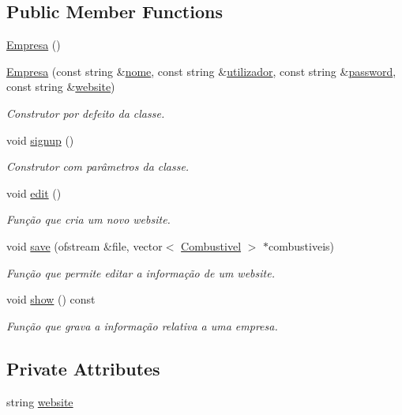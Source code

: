 \subsection*{Public Member Functions}
\begin{DoxyCompactItemize}
\item 
\hyperlink{class_empresa_aff124b958356c479ab50ddf4cf302193}{Empresa} ()
\item 
\hyperlink{class_empresa_a8d57f5422b13a48395f63d82a51bede5}{Empresa} (const string \&\hyperlink{class_membro_a2598bbe34ae32a98f41468b2202a9555}{nome}, const string \&\hyperlink{class_membro_a42cc733ff94ec8d1bbfdacc62dfbb0e7}{utilizador}, const string \&\hyperlink{class_membro_ae2b12fc3e91efc674c07e735edf4ac21}{password}, const string \&\hyperlink{class_empresa_a809624b98d1db18f8627ce2fa394dddd}{website})
\begin{DoxyCompactList}\small\item\em Construtor por defeito da classe. \end{DoxyCompactList}\item 
void \hyperlink{class_empresa_a93293b79b5b56973c3a3d3880d325c14}{signup} ()
\begin{DoxyCompactList}\small\item\em Construtor com parâmetros da classe. \end{DoxyCompactList}\item 
void \hyperlink{class_empresa_a97feeb44a837e086f7aa92f8c9a1ea10}{edit} ()
\begin{DoxyCompactList}\small\item\em Função que cria um novo website. \end{DoxyCompactList}\item 
void \hyperlink{class_empresa_a508c9c178a2933255eadc7955d3f8089}{save} (ofstream \&file, vector$<$ \hyperlink{class_combustivel}{Combustivel} $>$ $\ast$combustiveis)
\begin{DoxyCompactList}\small\item\em Função que permite editar a informação de um website. \end{DoxyCompactList}\item 
void \hyperlink{class_empresa_a707dc497843f63a2d094fb6871fa5b7d}{show} () const 
\begin{DoxyCompactList}\small\item\em Função que grava a informação relativa a uma empresa. \end{DoxyCompactList}\end{DoxyCompactItemize}
\subsection*{Private Attributes}
\begin{DoxyCompactItemize}
\item 
string \hyperlink{class_empresa_a809624b98d1db18f8627ce2fa394dddd}{website}
\end{DoxyCompactItemize}
